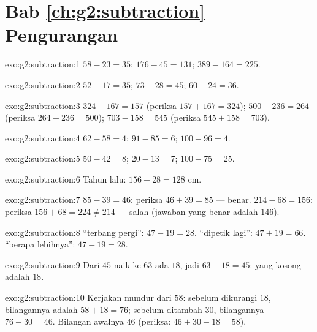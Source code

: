 \section*{Bab \ref{ch:g2:subtraction} --- Pengurangan}

\begin{solution}{exo:g2:subtraction:1}
$58 - 23 = 35$; \quad $176 - 45 = 131$; \quad $389 - 164 = 225$.
\end{solution}

\begin{solution}{exo:g2:subtraction:2}
$52 - 17 = 35$; \quad $73 - 28 = 45$; \quad $60 - 24 = 36$.
\end{solution}

\begin{solution}{exo:g2:subtraction:3}
$324 - 167 = 157$ (periksa $157 + 167 = 324$); \quad
$500 - 236 = 264$ (periksa $264 + 236 = 500$); \quad
$703 - 158 = 545$ (periksa $545 + 158 = 703$).
\end{solution}

\begin{solution}{exo:g2:subtraction:4}
$62 - 58 = 4$; \quad $91 - 85 = 6$; \quad $100 - 96 = 4$.
\end{solution}

\begin{solution}{exo:g2:subtraction:5}
$50 - 42 = 8$; \quad $20 - 13 = 7$; \quad $100 - 75 = 25$.
\end{solution}

\begin{solution}{exo:g2:subtraction:6}
Tahun lalu: $156 - 28 = 128$ cm.
\end{solution}

\begin{solution}{exo:g2:subtraction:7}
$85 - 39 = 46$: periksa $46 + 39 = 85$ --- benar.
$214 - 68 = 156$: periksa $156 + 68 = 224 \neq 214$ --- salah
(jawaban yang benar adalah $146$).
\end{solution}

\begin{solution}{exo:g2:subtraction:8}
``terbang pergi'': $47 - 19 = 28$. ``dipetik lagi'': $47 + 19 = 66$.
``berapa lebihnya'': $47 - 19 = 28$.
\end{solution}

\begin{solution}{exo:g2:subtraction:9}
Dari $45$ naik ke $63$ ada $18$, jadi $63 - 18 = 45$: yang kosong adalah $18$.
\end{solution}

\begin{solution}{exo:g2:subtraction:10}
Kerjakan mundur dari $58$: sebelum dikurangi $18$, bilangannya adalah
$58 + 18 = 76$; sebelum ditambah $30$, bilangannya $76 - 30 = 46$.
Bilangan awalnya $46$ (periksa: $46 + 30 - 18 = 58$).

\end{solution}
